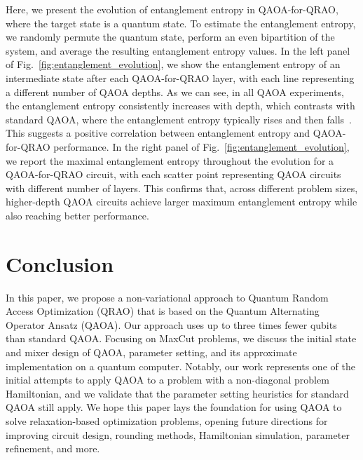 \documentclass[conference,10pt]{IEEEtran}
\newcommand{\QAOAQRAO}{QAOA-for-QRAO}
\begin{document}
Here, we present the evolution of entanglement entropy in \QAOAQRAO{}, where the target state is a quantum state.  To estimate the entanglement entropy, we randomly permute the quantum state, perform an even bipartition of the system, and average the resulting entanglement entropy values. 
In the left panel of Fig.~\ref{fig:entanglement_evolution}, we show the entanglement entropy of an intermediate state after each \QAOAQRAO{} layer, with each line representing a different number of QAOA depths. As we can see, in all QAOA experiments, the entanglement entropy consistently increases with depth, which contrasts with standard QAOA, where the entanglement entropy typically rises and then falls~\cite{dupont2022entanglement}. This suggests a positive correlation between entanglement entropy and \QAOAQRAO{} performance.
In the right panel of Fig.~\ref{fig:entanglement_evolution}, we report the maximal entanglement entropy throughout the evolution for a \QAOAQRAO{} circuit, with each scatter point representing QAOA circuits with different number of layers. This confirms that, across different problem sizes, higher-depth QAOA circuits achieve larger maximum entanglement entropy while also reaching better performance.

\section{Conclusion}
In this paper, we propose a non-variational approach to Quantum Random Access Optimization (QRAO) that is based on the Quantum Alternating Operator Ansatz (QAOA). Our approach uses up to three times fewer qubits than standard QAOA.
Focusing on MaxCut problems, we discuss the initial state and mixer design of QAOA, parameter setting, and its approximate implementation on a quantum computer. 
Notably, our work represents one of the initial attempts to apply QAOA to a problem with a non-diagonal problem Hamiltonian, and we validate that the parameter setting heuristics for standard QAOA still apply. We hope this paper lays the foundation for using QAOA to solve relaxation-based optimization problems, opening future directions for improving circuit design, rounding methods, Hamiltonian simulation, parameter refinement, and more.





 
\end{document}
